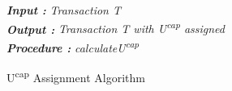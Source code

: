 %
\begin{algorithm}
\textbf{\emph{Input :}} \emph{Transaction T}\\
 \textbf{\emph{Output : }}\emph{Transaction T with U\textsuperscript{cap} assigned} \\
 \textbf{\emph{Procedure : }}\emph{calculateU\textsuperscript{cap}}\\
 \caption{U\textsuperscript{cap} Assignment Algorithm }
 \label{algorithm:cap_assignment}
\end{algorithm}

